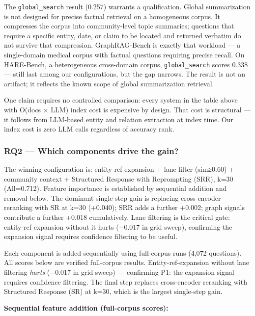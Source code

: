 The \texttt{global\_search} result (0.257) warrants a qualification. Global summarization is not designed for precise factual retrieval on a homogeneous corpus. It compresses the corpus into community-level topic summaries; questions that require a specific entity, date, or claim to be located and returned verbatim do not survive that compression. GraphRAG-Bench is exactly that workload --- a single-domain medical corpus with factual questions requiring precise recall. On HARE-Bench, a heterogeneous cross-domain corpus, \texttt{global\_search} scores 0.338 --- still last among our configurations, but the gap narrows. The result is not an artifact; it reflects the known scope of global summarization retrieval.

One claim requires no controlled comparison: every system in the table above with O(docs × LLM) index cost is expensive by design. That cost is structural --- it follows from LLM-based entity and relation extraction at index time. Our index cost is zero LLM calls regardless of accuracy rank.

\subsubsection{RQ2 --- Which components drive the gain?}\label{rq2-which-components-drive-the-gain}

The winning configuration is: entity-ref expansion + lane filter (sim≥0.60) + community context + Structured Response with Reprompting (SRR), k=30 (All=0.712). Feature importance is established by sequential addition and removal below. The dominant single-step gain is replacing cross-encoder reranking with SR at k=30 (+0.040); SRR adds a further +0.002; graph signals contribute a further +0.018 cumulatively. Lane filtering is the critical gate: entity-ref expansion without it hurts (−0.017 in grid sweep), confirming the expansion signal requires confidence filtering to be useful.

Each component is added sequentially using full-corpus runs (4,072 questions). All scores below are verified full-corpus results. Entity-ref-expansion without lane filtering \emph{hurts} (−0.017 in grid sweep) --- confirming P1: the expansion signal requires confidence filtering. The final step replaces cross-encoder reranking with Structured Response (SR) at k=30, which is the largest single-step gain.

\textbf{Sequential feature addition (full-corpus scores):}

